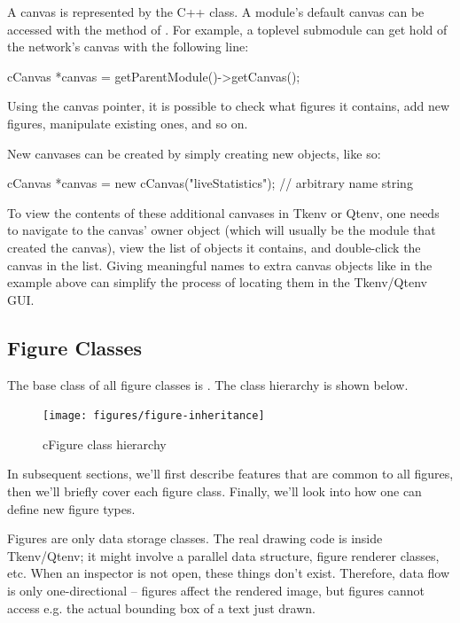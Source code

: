 A canvas is represented by the  C++ class. A module's
default canvas can be accessed with the  method of
. For example, a toplevel submodule can get hold of the
network's canvas with the following line:

\begin{cpp}
cCanvas *canvas = getParentModule()->getCanvas();
\end{cpp}

Using the canvas pointer, it is possible to check what figures it
contains, add new figures, manipulate existing ones, and so on.

New canvases can be created by simply creating new 
objects, like so:

\begin{cpp}
cCanvas *canvas = new cCanvas("liveStatistics"); // arbitrary name string
\end{cpp}

To view the contents of these additional canvases in Tkenv or Qtenv, one
needs to navigate to the canvas' owner object (which will usually be the
module that created the canvas), view the list of objects it contains, and
double-click the canvas in the list. Giving meaningful names to extra
canvas objects like in the example above can simplify the process of
locating them in the Tkenv/Qtenv GUI.


\subsection{Figure Classes}

The base class of all figure classes is . The class hierarchy
is shown below.

\begin{figure}[htbp]
  \begin{center}
    \texttt{[image: figures/figure-inheritance]}
    \caption{cFigure class hierarchy}
  \end{center}
\end{figure}

In subsequent sections, we'll first describe features that are common
to all figures, then we'll briefly cover each figure class. Finally,
we'll look into how one can define new figure types.

\begin{note}
Figures are only data storage classes. The real drawing code is inside
Tkenv/Qtenv; it might involve a parallel data structure, figure renderer classes, etc.
When an inspector is not open, these things don't exist. Therefore, data flow
is only one-directional -- figures affect the rendered image, but figures
cannot access e.g. the actual bounding box of a text just drawn.
\end{note}


